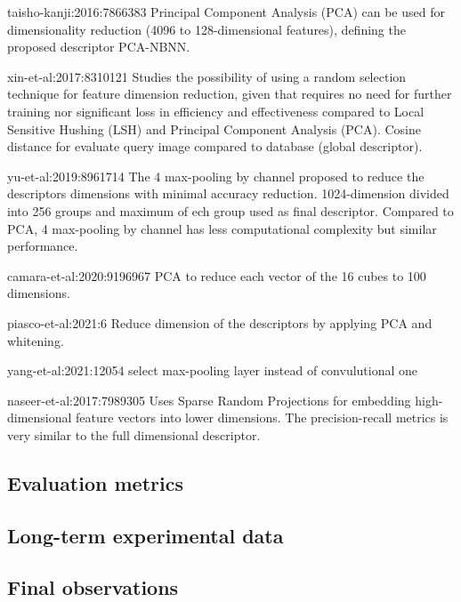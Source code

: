 taisho-kanji:2016:7866383
Principal Component Analysis (PCA) can be used for dimensionality reduction (4096 to 128-dimensional features), defining the proposed descriptor PCA-NBNN.

xin-et-al:2017:8310121
Studies the possibility of using a random selection technique for feature dimension reduction, given that requires no need for further training nor significant loss in efficiency and effectiveness compared to Local Sensitive Hushing (LSH) and Principal Component Analysis (PCA).
Cosine distance for evaluate query image compared to database (global descriptor).

yu-et-al:2019:8961714
The 4 max-pooling by channel proposed to reduce the descriptors dimensions with minimal accuracy reduction. 1024-dimension divided into 256 groups and maximum of ech group used as final descriptor. Compared to PCA, 4 max-pooling by channel has less computational complexity but similar performance.

camara-et-al:2020:9196967
PCA to reduce each vector of the 16 cubes to 100 dimensions.

piasco-et-al:2021:6
Reduce dimension of the descriptors by applying PCA and whitening.

yang-et-al:2021:12054
select max-pooling layer instead of convulutional one

naseer-et-al:2017:7989305
Uses Sparse Random Projections for embedding high-dimensional feature vectors into lower dimensions. The precision-recall metrics is very similar to the full dimensional descriptor.

\subsection{Evaluation metrics}
\label{sec:discussion:metrics}

\subsection{Long-term experimental data}
\label{sec:discussion:experiments}

%

\subsection{Final observations}
\label{sec:discussion:observations}

